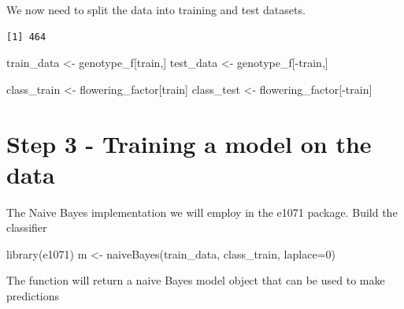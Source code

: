 \documentclass[
]{article}
\newenvironment{Shaded}{\begin{snugshade}}{\end{snugshade}}
\newcommand{\AttributeTok}[1]{\textcolor[rgb]{0.77,0.63,0.00}{#1}}
\newcommand{\DecValTok}[1]{\textcolor[rgb]{0.00,0.00,0.81}{#1}}
\newcommand{\FunctionTok}[1]{\textcolor[rgb]{0.00,0.00,0.00}{#1}}
\newcommand{\NormalTok}[1]{#1}
\newcommand{\OtherTok}[1]{\textcolor[rgb]{0.56,0.35,0.01}{#1}}
\newcommand{\SpecialCharTok}[1]{\textcolor[rgb]{0.00,0.00,0.00}{#1}}
\begin{document}
We now need to split the data into training and test datasets.

\begin{Shaded}
\end{Shaded}

\begin{verbatim}
[1] 464
\end{verbatim}

\begin{Shaded}
\begin{Highlighting}[]
\NormalTok{train\_data }\OtherTok{\textless{}{-}}\NormalTok{ genotype\_f[train,]}
\NormalTok{test\_data }\OtherTok{\textless{}{-}}\NormalTok{ genotype\_f[}\SpecialCharTok{{-}}\NormalTok{train,]}

\NormalTok{class\_train }\OtherTok{\textless{}{-}}\NormalTok{ flowering\_factor[train]}
\NormalTok{class\_test }\OtherTok{\textless{}{-}}\NormalTok{ flowering\_factor[}\SpecialCharTok{{-}}\NormalTok{train]}
\end{Highlighting}
\end{Shaded}

\hypertarget{step-3---training-a-model-on-the-data}{%
\section{Step 3 - Training a model on the
data}\label{step-3---training-a-model-on-the-data}}

The Naive Bayes implementation we will employ in the e1071 package.
Build the classifier

\begin{Shaded}
\begin{Highlighting}[]
\FunctionTok{library}\NormalTok{(e1071)}
\NormalTok{m }\OtherTok{\textless{}{-}} \FunctionTok{naiveBayes}\NormalTok{(train\_data, class\_train, }\AttributeTok{laplace=}\DecValTok{0}\NormalTok{)}
\end{Highlighting}
\end{Shaded}

The function will return a naive Bayes model object that can be used to
make predictions
\end{document}
